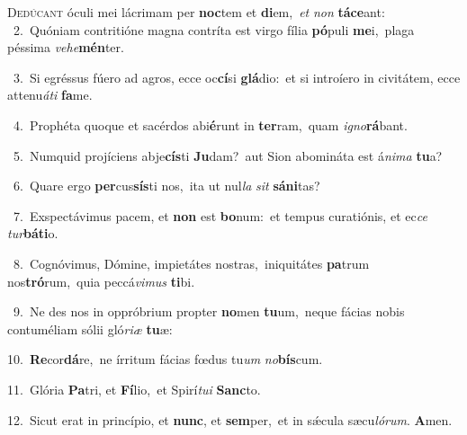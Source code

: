 \lettrine{\initial\textcolor{\initialcolor}{D}}{edúcant} óculi mei lácrimam per \textbf{noc}\-tem et \textbf{di}\-em,~\star \textit{et} \textit{non} \textbf{tá}\-\textbf{ce}ant:\\
{\numbfont\textcolor{\numbcolor}{~2.}}~Quóniam contritióne magna contríta est virgo fília \textbf{pó}\-puli \textbf{me}\-i,~\star plaga péssima \textit{ve}\-\textit{he}\textbf{mén}ter.\par
{\numbfont\textcolor{\numbcolor}{~3.}}~Si egréssus fúero ad agros, ecce oc\-\textbf{cí}\-si \textbf{glá}\-dio:~\star et si introíero in civitátem, ecce attenu\-\textit{á}\-\textit{ti} \textbf{fa}\-me.\par
{\numbfont\textcolor{\numbcolor}{~4.}}~Prophéta quoque et sacérdos abi\-\textbf{é}\-runt in \textbf{ter}\-ram,~\star quam \textit{i}\-\textit{gno}\textbf{rá}bant.\par
{\numbfont\textcolor{\numbcolor}{~5.}}~Numquid projíciens abje\-\textbf{cís}\-ti \textbf{Ju}\-dam?~\star aut Sion abomináta est á\-\textit{ni}\-\textit{ma} \textbf{tu}\-a?\par
{\numbfont\textcolor{\numbcolor}{~6.}}~Quare ergo \textbf{per}\-cus\-\textbf{sís}\-ti nos,~\star ita ut nul\textit{la} \textit{sit} \textbf{sá}\-\textbf{ni}tas?\par
{\numbfont\textcolor{\numbcolor}{~7.}}~Exspectávimus pacem, et \textbf{non} est \textbf{bo}\-num:~\star et tempus curatiónis, et ec\textit{ce} \textit{tur}\-\textbf{bá}\textbf{ti}o.\par
{\numbfont\textcolor{\numbcolor}{~8.}}~Cognóvimus, Dómine, impietátes nostras,~\dagger iniquitátes \textbf{pa}\-trum nos\-\textbf{tró}\-rum,~\star quia peccá\-\textit{vi}\-\textit{mus} \textbf{ti}\-bi.\par
{\numbfont\textcolor{\numbcolor}{~9.}}~Ne des nos in oppróbrium propter \textbf{no}\-men \textbf{tu}\-um,~\star neque fácias nobis contuméliam sólii gló\-\textit{ri}\-\textit{æ} \textbf{tu}\-æ:\par
{\numbfont\textcolor{\numbcolor}{10.}}~\-\textbf{Re}\-cor\-\textbf{dá}\-re,~\star ne írritum fácias fœdus tu\textit{um} \textit{no}\-\textbf{bís}cum.\par
{\numbfont\textcolor{\numbcolor}{11.}}~Glória \textbf{Pa}\-tri, et \textbf{Fí}\-lio,~\star et Spirí\-\textit{tu}\-\textit{i} \textbf{Sanc}\-to.\par
{\numbfont\textcolor{\numbcolor}{12.}}~Sicut erat in princípio, et \textbf{nunc}\-, et \textbf{sem}\-per,~\star et in sǽcula sæcu\-\textit{ló}\-\textit{rum}. \textbf{A}\-men.\par
